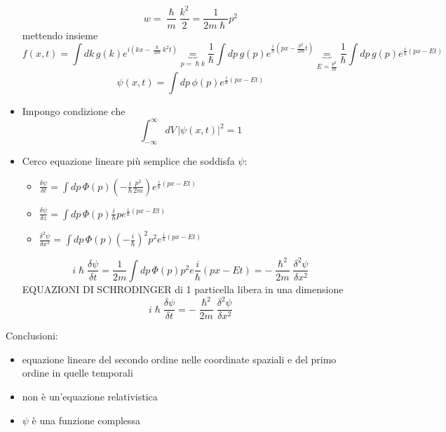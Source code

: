 \documentclass[a4paper,11pt]{report}
\theoremstyle{remark}
\theoremstyle{definition}
\begin{document}
\begin{itemize}
\begin{equation*}
        w = \frac{\hslash}{m}\frac{k^2}{2} = \frac{1}{2m\hslash}p^2
    \end{equation*}
    mettendo insieme
    \begin{equation*}
        f(x,t) = \int dk \, g(k) e^{i\left(kx - \frac{\hslash}{2m}k^2t\right)}\underbrace{=}_{p=\hslash k} \frac{1}{\hslash}\int dp \, g(p)e^{\frac{i}{\hslash}\left(px - \frac{p^2}{2m}t\right)} \underbrace{=}_{E=\frac{p^2}{m}} \frac{1}{\hslash}\int dp \, g(p)e^{\frac{i}{\hslash}(px - Et)}
    \end{equation*}
    \begin{equation*}
        \psi (x,t) = \int dp \, \phi(p) e^{\frac{i}{\hslash}(px - Et)}
    \end{equation*}
    \item Impongo condizione che 
    \begin{equation*}
        \int_{-\infty}^\infty dV \, {|\psi(x,t)|}^2 = 1 
    \end{equation*}
    \item Cerco equazione lineare più semplice che soddisfa $\psi$:
    \begin{itemize}
        \item $\frac{\delta \psi}{\delta t} = \int dp \, \Phi (p) \left(-\frac{i}{\hslash}\frac{p^2}{2m}\right)e^{\frac{i}{\hslash}(px-Et)}$
        \item  $\frac{\delta \psi}{\delta z} = \int dp \, \Phi (p) \frac{i}{\hslash}p e^{\frac{i}{\hslash}(px-Et)}$
        \item $\frac{\delta^2 \psi}{\delta x^2} = \int dp \, \Phi (p) {\left(-\frac{i}{\hslash}\right)}^2p^2 e^{\frac{i}{\hslash}(px-Et)}$
    \end{itemize}
    \begin{equation*}
        i\hslash \frac{\delta \psi}{\delta t} = \frac{1}{2m} \int dp \, \Phi (p) p^2 e{\frac{i}{\hslash}(px-Et)} = -\frac{\hslash^2}{2m} \frac{\delta^2 \psi}{\delta x^2}
    \end{equation*}
    EQUAZIONI DI SCHRODINGER di 1 particella libera in una dimensione 
    \begin{equation}
        i\hslash \frac{\delta \psi}{\delta t} = -\frac{\hslash^2}{2m} \frac{\delta^2 \psi}{\delta x^2}
    \end{equation}
\end{itemize}
Conclusioni:
\begin{itemize}
    \item equazione lineare del secondo ordine nelle coordinate spaziali e del primo ordine in quelle temporali
    \item non è un'equazione relativistica
    \item $\psi$ è una funzione complessa
\end{itemize}
\end{document}

